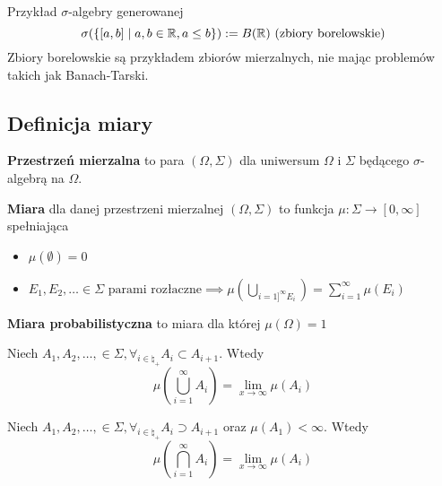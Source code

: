 \begin{example}
	Przykład \(\sigma\)-algebry generowanej
	\[
		\sigma(\set{[a, b] \mid a, b \in \real, a \leq b}) := B(\real) \text{ (zbiory borelowskie)}
	\]
	Zbiory borelowskie są przykładem zbiorów mierzalnych, nie mając problemów takich jak Banach-Tarski.
\end{example}


\subsection{Definicja miary}

\begin{definition}
	\textbf{Przestrzeń mierzalna} to para \((\Omega, \Sigma)\) dla uniwersum \(\Omega\) i \(\Sigma\) będącego \(\sigma\)-algebrą na \(\Omega\).
\end{definition}

\begin{definition}
	\textbf{Miara} dla danej przestrzeni mierzalnej \((\Omega, \Sigma)\) to funkcja \(\mu: \Sigma \to [0, \infty]\) spełniająca
	\begin{itemize}
		\item \(\mu(\emptyset) = 0\)
		\item \(E_1, E_2, \dots \in \Sigma \text{ parami rozłaczne} \implies \mu(\bigcup_{i=1]^\infty E_i}) = \sum_{i=1}^{\infty} \mu(E_i)\)
	\end{itemize}
\end{definition}

\begin{definition}
	\textbf{Miara probabilistyczna} to miara dla której \(\mu(\Omega) = 1\)
\end{definition}

\begin{lemma}
	Niech \(A_1, A_2, \dots, \in \Sigma, \forall_{i \in \natural_+} A_i \subset A_{i+1}\). Wtedy
	\[
		\mu(\bigcup_{i=1}^\infty A_i) = \lim_{x \to \infty} \mu(A_i)
	\]
\end{lemma}

\begin{lemma}
	Niech \(A_1, A_2, \dots, \in \Sigma, \forall_{i \in \natural_+} A_i \supset A_{i+1}\) oraz \(\mu(A_1) < \infty\). Wtedy
	\[
		\mu(\bigcap_{i=1}^\infty A_i) = \lim_{x \to \infty} \mu(A_i)
	\]
\end{lemma}

